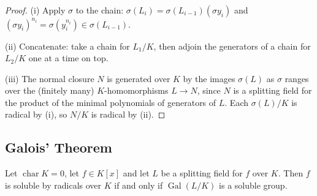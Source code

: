 \documentclass[a4paper]{scrartcl}
\newcommand{\charr}{\operatorname{char}}
\newcommand{\Gal}{\operatorname{Gal}}
\begin{document}
\begin{proof}
	(i) Apply $\sigma$ to the chain: $\sigma(L_i) = \sigma(L_{i-1})(\sigma y_i)$ and $(\sigma y_i)^{n_i} = \sigma(y_i^{n_i})\in\sigma(L_{i-1})$.

	(ii) Concatenate: take a chain for $L_1/K$, then adjoin the generators of a chain for $L_2/K$ one at a time on top.

	(iii) The normal closure $N$ is generated over $K$ by the images $\sigma(L)$ as $\sigma$ ranges over the (finitely many) $K$-homomorphisms $L \to N$, since $N$ is a splitting field for the product of the minimal polynomials of generators of $L$. Each $\sigma(L)/K$ is radical by (i), so $N/K$ is radical by (ii).
\end{proof}

\subsection{Galois' Theorem}

\begin{theorem}[Galois]\label{thm:galoissoluble}
	Let $\charr K = 0$, let $f \in K[x]$ and let $L$ be a splitting field for $f$ over $K$. Then $f$ is soluble by radicals over $K$ if and only if $\Gal(L/K)$ is a soluble group.
\end{theorem}
\end{document}
